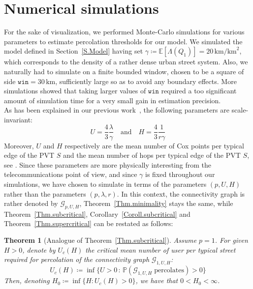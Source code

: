 \documentclass[10pt,a4paper]{amsart}
\theoremstyle{exampstyle}
\newtheorem{Theorem}{Theorem}
\theoremstyle{exampnotations}
\begin{document}
\section{Numerical simulations}
\label{S.NumericalSimulations}
For the sake of visualization, we performed Monte-Carlo simulations for various parameters to estimate percolation thresholds for our model. We simulated the model defined in Section~\ref{S.Model} having set $\gamma \coloneqq \mathbb{E}\left[\Lambda(Q_1)\right] = 20 \, \text{km/km}^2$, which corresponds to the density of a rather dense urban street system.
Also, we naturally had to simulate on a finite bounded window, chosen to be a square of side $\texttt{win}=30 \, \text{km}$, sufficiently large so as to avoid any boundary effects. More simulations showed that taking larger values of $\texttt{win}$ required a too significant amount of simulation time for a very small gain in estimation precision. \\
\indent As has been explained in our previous work~\cite{LeGal1904:Influence}, the following parameters are scale-invariant:
\begin{equation*}
    U=\frac{4}{3}\frac{\lambda}{\gamma} \quad \text{and} \quad H=\frac{4}{3}\frac{1}{r\gamma}
\end{equation*}
Moreover, $U$ and $H$ respectively are the mean number of Cox points per typical edge of the PVT $S$ and the mean number of hops per typical edge of the PVT $S$, see \cite[Section 9.4]{chiu_stochastic_2013}. Since these parameters are more physically interesting from the telecommunications point of view, and since $\gamma$ is fixed throughout our simulations, we have chosen to simulate in terms of the parameters $(p,U,H)$ rather than the parameters $(p,\lambda,r)$. In this context, the connectivity graph is rather denoted by $\mathcal{G}_{p,U,H}$, Theorem~\ref{Thm.minimality} stays the same, while Theorem~\ref{Thm.subcritical}, Corollary~\ref{Coroll.subcritical} and Theorem~\ref{Thm.supercritical} can be restated as follows:
\begin{Theorem}[Analogue of Theorem~\ref{Thm.subcritical}]
\label{Thm.analogue:subcritical}
Assume $p=1$. For given $H > 0$, denote by $U_c(H)$ the critical mean number of user per typical street required for percolation of the connectivity graph $\mathcal{G}_{1,U,H}$:
$$  U_c(H) \coloneqq \inf \lbrace U > 0 \, : \, \mathbb{P}(\mathcal{G}_{1, U, H} \; \text{percolates}) > 0 \rbrace$$
Then, denoting $H_0 \coloneqq \inf \lbrace H : U_c(H) > 0 \rbrace$, we have that $0 < H_0 < \infty$.
\end{Theorem}
\end{document}
